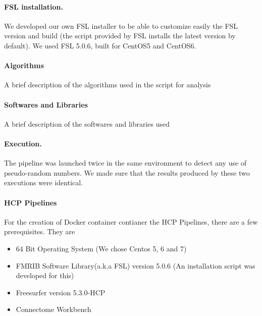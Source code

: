 \documentclass{article}
\begin{document}
\paragraph{FSL installation.} We developed our own FSL installer to be
able to customize easily the FSL version and build (the script
provided by FSL installs the latest version by default). We used FSL
5.0.6, built for CentOS5 and CentOS6.

\paragraph{Algorithms}
A brief description of the algorithms used in the script for analysis

\paragraph{Softwares and Libraries}
A brief description of the softwares and libraries used

\paragraph{Execution.} The pipeline was launched twice in the same
environment to detect any use of pseudo-random numbers. We
made sure that the results produced by these two executions were
identical.

\paragraph{HCP Pipelines}

For the creation of Docker container contianer the HCP Pipelines, there are a few prerequisites. They are

\begin{itemize}
  \item 64 Bit Operating System (We chose Centos 5, 6 and 7)
  \item FMRIB Software Library(a.k.a FSL) version 5.0.6 (An installation script was developed for this)
  \item Freesurfer version 5.3.0-HCP
  \item Connectome Workbench
\end{itemize}
\end{document}
